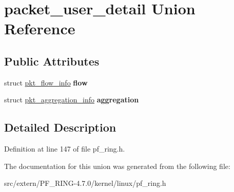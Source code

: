 \hypertarget{unionpacket__user__detail}{
\section{packet\_\-user\_\-detail Union Reference}
\label{unionpacket__user__detail}
}
\subsection*{Public Attributes}
\begin{DoxyCompactItemize}
\item 
\hypertarget{unionpacket__user__detail_af44e31a7407bfa7d5c6c5212fe85b8d0}{
struct \hyperlink{structpkt__flow__info}{pkt\_\-flow\_\-info} {\bfseries flow}}
\label{unionpacket__user__detail_af44e31a7407bfa7d5c6c5212fe85b8d0}

\item 
\hypertarget{unionpacket__user__detail_a4014857cd0619c65c92debbf2342e565}{
struct \hyperlink{structpkt__aggregation__info}{pkt\_\-aggregation\_\-info} {\bfseries aggregation}}
\label{unionpacket__user__detail_a4014857cd0619c65c92debbf2342e565}

\end{DoxyCompactItemize}


\subsection{Detailed Description}


Definition at line 147 of file pf\_\-ring.h.



The documentation for this union was generated from the following file:\begin{DoxyCompactItemize}
\item 
src/extern/PF\_\-RING-\/4.7.0/kernel/linux/pf\_\-ring.h\end{DoxyCompactItemize}
